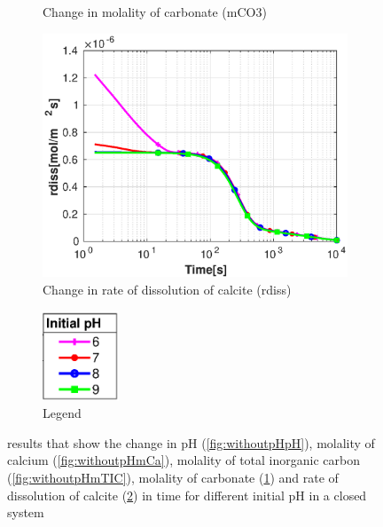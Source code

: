 \begin{figure}[!h]
\begin{subfigure}{.5\linewidth}
        \caption{Change in molality of carbonate (mCO3)}
        \label{fig:withoutpHmCO3}
    \end{subfigure}%
    \hfill
    \begin{subfigure}{.5\linewidth}
            \centering
        \includegraphics[width=\textwidth]{PICTURES/without_pH_rdiss.eps}
        \caption{Change in rate of dissolution of calcite (rdiss)}
        \label{fig:withoutpHrdiss}
    \end{subfigure}%
  \hfill
  \begin{subfigure}{.5\linewidth}
            \centering
        \includegraphics[width=0.25\textwidth]{PICTURES/with_pH_legend.eps}
        \caption{Legend}
        \label{fig:withoutpHlegend}
    \end{subfigure}%
    \caption{\DuMuX results that show the change in pH (\cref{fig:withoutpHpH}), molality of calcium (\cref{fig:withoutpHmCa}), 
    molality of total inorganic carbon (\cref{fig:withoutpHmTIC}), molality of carbonate (\cref{fig:withoutpHmCO3}) 
    and rate of dissolution of calcite (\cref{fig:withoutpHrdiss}) in time for different initial pH in a closed system}
    
    \label{fig:comparisionWithoutDiffInitialpH}
\end{figure}

